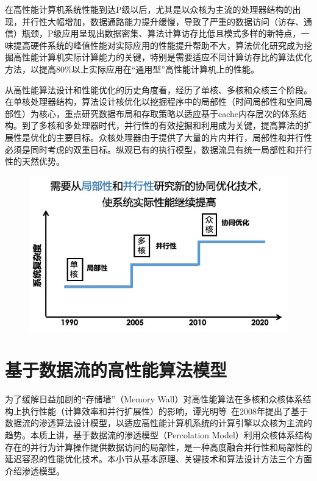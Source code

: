 \begin{flushleft}
在高性能计算机系统性能到达P级以后，尤其是以众核为主流的处理器结构的出现，并行性大幅增加，数据通路能力提升缓慢，导致了严重的数据访问（访存、通信）瓶颈，P级应用呈现出数据密集、算法计算访存比低且模式多样的新特点，一味提高硬件系统的峰值性能对实际应用的性能提升帮助不大，算法优化研究成为挖掘高性能计算机实际计算能力的关键，特别是需要适应不同计算访存比的算法优化方法，以提高80\%以上实际应用在“通用型”高性能计算机上的性能。

从高性能算法设计和性能优化的历史角度看，经历了单核、多核和众核三个阶段。在单核处理器结构，算法设计核优化以挖掘程序中的局部性（时间局部性和空间局部性）为核心，重点研究数据布局和存取策略以适应基于cache内存层次的体系结构。到了多核和多处理器时代，并行性的有效挖掘和利用成为关键，提高算法的扩展性是优化的主要目标。众核处理器由于提供了大量的片内并行，局部性和并行性必须是同时考虑的双重目标。纵观已有的执行模型，数据流具有统一局部性和并行性的天然优势。

\begin{figure}[!htbp]
	\centering
	\includegraphics[clip, scale=0.4]{Img/Chap_Algorithm/background}
	\label{fig:background}
\end{figure}

\section{基于数据流的高性能算法模型}\label{sec:percolation}

为了缓解日益加剧的“存储墙”（Memory Wall）对高性能算法在多核和众核体系结构上执行性能（计算效率和并行扩展性）的影响，谭光明等~\citep{TanThesis,TanTPDS09}在2008年提出了基于数据流的渗透算法设计模型，以适应高性能计算机系统的计算引擎以众核为主流的趋势。本质上讲，基于数据流的渗透模型（Percolation Model）利用众核体系结构存在的并行为计算操作提供数据访问的局部性，是一种高度融合并行性和局部性的延迟容忍的性能优化技术。本小节从基本原理、关键技术和算法设计方法三个方面介绍渗透模型。


\end{flushleft}
